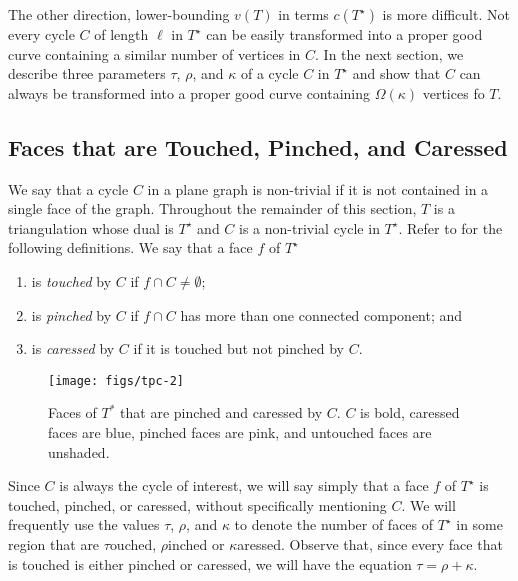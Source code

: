 \documentclass{patmorin}
\newcommand{\dual}[1]{{#1}^\star}
\begin{document}
The other direction, lower-bounding $v(T)$ in terms $c(\dual{T})$
is more difficult. Not every cycle $C$ of length $\ell$ in $\dual{T}$
can be easily transformed into a proper good curve containing a similar
number of vertices in $C$.  In the next section, we describe three
parameters $\tau$, $\rho$, and $\kappa$ of a cycle $C$ in $\dual{T}$
and show that $C$ can always be transformed into a proper good curve
containing $\Omega(\kappa)$ vertices fo $T$.

\subsection{Faces that are Touched, Pinched, and Caressed}

We say that a cycle $C$ in a plane graph is non-trivial if it
is not contained in a single face of the graph.  Throughout the
remainder of this section, $T$ is a triangulation whose dual is
$\dual{T}$ and $C$ is a non-trivial cycle in $\dual{T}$.  Refer to
 for the following definitions.
We say that a face $f$ of $\dual{T}$ 
\begin{enumerate}
  \item is \emph{touched} by $C$ if $f\cap C\neq \emptyset$;
  \item is \emph{pinched} by $C$ if $f\cap C$ has more than one connected component; and
  \item is \emph{caressed} by $C$ if it is touched but not pinched by $C$.
\end{enumerate}

\begin{figure}
\begin{center}
	  \texttt{[image: figs/tpc-2]}
\end{center}
	  \caption{Faces of $T^*$ that are pinched and caressed by $C$. $C$ is bold, caressed faces are blue, pinched faces are pink, and untouched faces are unshaded.}
\end{figure}


Since $C$ is always the cycle of interest, we will say simply that a face
$f$ of $\dual{T}$ is touched, pinched, or caressed, without specifically
mentioning $C$.  We will frequently use the values $\tau$, $\rho$,
and $\kappa$ to denote the number of faces of $\dual{T}$ in some region
that are $\tau$ouched, $\rho$inched or $\kappa$aressed.  Observe that,
since every face that is touched is either pinched or caressed, we will
have the equation $\tau = \rho + \kappa$.
\end{document}
